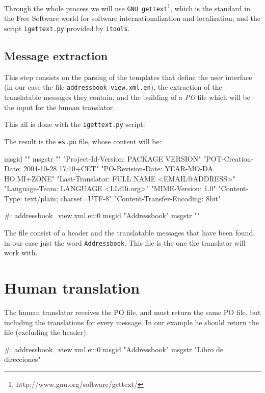 Through the whole process we will use {\tt GNU
gettext}\footnote{http://www.gnu.org/software/gettext/}, which is the
standard in the Free Software world for software internationalization
and localization; and the script {\tt igettext.py} provided by {\tt itools}.


\subsection{Message extraction}

This step consists on the parsing of the templates that define the user
interface (in our case the file {\tt addressbook\_view.xml.en}), the
extraction of the translatable messages they contain, and the building of
a {\em PO} file which will be the input for the human translator.

This all is done with the {\tt igettext.py} script:


The result is the {\tt es.po} file, whose content will be:

\begin{code}
    msgid ""
    msgstr ""
    "Project-Id-Version: PACKAGE VERSION\n"
    "POT-Creation-Date: 2004-10-28 17:10+CET\n"
    "PO-Revision-Date: YEAR-MO-DA HO:MI+ZONE\n"
    "Last-Translator: FULL NAME <EMAIL@ADDRESS>\n"
    "Language-Team: LANGUAGE <LL@li.org>\n"
    "MIME-Version: 1.0\n"
    "Content-Type: text/plain; charset=UTF-8\n"
    "Content-Transfer-Encoding: 8bit\n"

    #: addressbook_view.xml.en:0
    msgid "Addressbook"
    msgstr ""
\end{code}

The file consist of a header and the translatable messages that have been
found, in our case just the word {\tt Addressbook}. This file is the one
the translator will work with.


\section{Human translation}

The human translator receives the PO file, and must return the same PO
file, but including the translations for every message. In our example
he should return the file (excluding the header):

\begin{code}
    #: addressbook_view.xml.en:0
    msgid "Addressbook"
    msgstr "Libro de direcciones"
\end{code}

